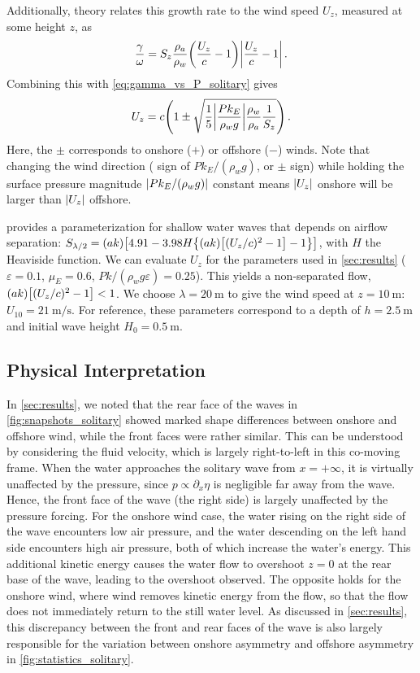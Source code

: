 \documentclass{jfm}
\renewcommand*{\epsilon}{\varepsilon}
\begin{document}
Additionally, \citet{jeffreys1925formation} theory relates this growth
rate to the wind speed $U_z$, measured at some height $z$, as
\begin{equation}
  \frac{\gamma}{\omega} = S_z \frac{\rho_a}{\rho_w}
    \pqty{\frac{U_z}{c}-1} \abs{\frac{U_z}{c}-1} \,.
  \label{eq:gamma_vs_u_jeffreys}
\end{equation}
Combining this with \cref{eq:gamma_vs_P_solitary} gives
\begin{equation}
  U_z = c \pqty{1 \pm \sqrt{\frac{1}{5} \abs{\frac{P k_E}{\rho_w g}}
    \frac{\rho_w}{\rho_a} \frac{1}{S_z}}} \,.
\end{equation}
Here, the $\pm$ corresponds to onshore ($+$) or offshore ($-$) winds.
Note that changing the wind direction (\ie{} sign of $Pk_E/(\rho_w g)$,
or $\pm$ sign) while holding the surface pressure magnitude
$\abs{Pk_E/(\rho_w g)}$ constant means $\abs{U_z}$ onshore will be
larger than $\abs{U_z}$ offshore.

 provides a parameterization for shallow water
waves that depends on airflow separation: $S_{\lambda/2} =
(ak)\bqty{4.91-3.98 H\Bqty{(ak)\bqty{(U_z/c)^2-1} - 1}}$, with $H$ the
Heaviside function.
We can evaluate $U_z$ for the parameters used in \cref{sec:results}
($\epsilon=0.1$, $\mu_E = 0.6$, $Pk/(\rho_w g \epsilon) = 0.25$).
This yields a non-separated flow, $(ak)\bqty{(U_z/c)^2-1} < 1$.
We choose $\lambda = \SI{20}{\meter}$ to give the wind speed at
$z=\SI{10}{\meter}$: $U_{10} = \SI{21}{\meter\per\second}$.
For reference, these parameters correspond to a depth of $h =
\SI{2.5}{\meter}$ and initial wave height $H_0 = \SI{0.5}{\meter}$.

\subsection{Physical Interpretation}
In \cref{sec:results}, we noted that the rear face of the waves in
\cref{fig:snapshots_solitary} showed marked shape differences between
onshore and offshore wind, while the front faces were rather similar.
This can be understood by considering the fluid velocity, which is
largely right-to-left in this co-moving frame.
When the water approaches the solitary wave from $x = +\infty$, it is
virtually unaffected by the pressure, since $p \propto \partial_x \eta$
is negligible far away from the wave.
Hence, the front face of the wave (the right side) is largely unaffected
by the pressure forcing.
For the onshore wind case, the water rising on the right side of the
wave encounters low air pressure, and the water descending on the left
hand side encounters high air pressure, both of which increase the
water's energy.
This additional kinetic energy causes the water flow to overshoot $z=0$
at the rear base of the wave, leading to the overshoot observed.
The opposite holds for the onshore wind, where wind removes kinetic energy
from the flow, so that the flow does not immediately return to the still
water level.
As discussed in \cref{sec:results}, this discrepancy between the front
and rear faces of the wave is also largely responsible for the variation
between onshore asymmetry and offshore asymmetry in
\cref{fig:statistics_solitary}.
\end{document}
